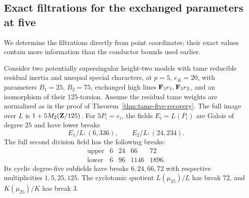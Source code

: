 \subsection{Exact filtrations for the exchanged parameters at five}
We determine the filtrations directly from point coordinates; their exact values contain more information than the conductor bounds used earlier.
\begin{proposition}\label{prop:exact-exchanged-point-profiles}
Consider two potentially supersingular height-two models with tame reducible residual inertia and unequal special characters, at $p=5$, $e_K=20$, with parameters $B_1=25$, $B_2=75$, exchanged high lines $\mathbf F_5e_1,\mathbf F_5e_2$, and an isomorphism of their $125$-torsion. Assume the residual tame weights are normalized as in the proof of Theorem~\ref{thm:tame-five-recovery}. The full image over $L$ is $1+5M_2(\mathbf Z/125)$. For $5P_i=e_i$, the fields $E_i=L(P_i)$ are Galois of degree $25$ and have lower breaks
\[
                  E_1/L:(6,336),\qquad E_2/L:(24,234).
\]
The full second division field has the following breaks:
\[
\begin{array}{c|rrrr}
\text{upper}&6&24&66&72\\
\text{lower}&6&96&1146&1896.
\end{array}
\] Its cyclic degree-five subfields have breaks $6,24,66,72$ with respective multiplicities $1,5,25,125$. The cyclotomic quotient $L(\mu_{25})/L$ has break $72$, and $K(\mu_{25})/K$ has break $3$.
\end{proposition}
